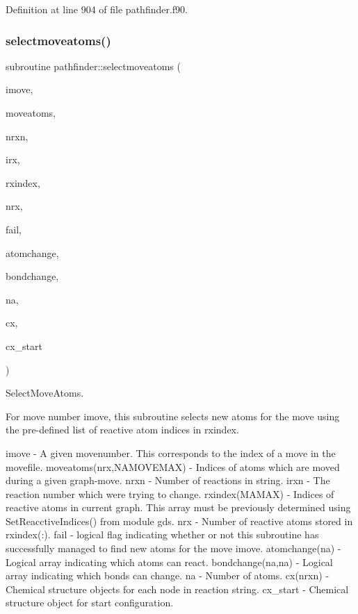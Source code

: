 Definition at line 904 of file pathfinder.\+f90.

\mbox{\label{namespacepathfinder_ad3176a0a22cdd34dd1b20fb26be06d66}} 
\subsubsection{\texorpdfstring{selectmoveatoms()}{selectmoveatoms()}}
{\footnotesize\ttfamily subroutine pathfinder\+::selectmoveatoms (\begin{DoxyParamCaption}\item[{integer}]{imove,  }\item[{integer, dimension(nrxn,namovemax)}]{moveatoms,  }\item[{integer}]{nrxn,  }\item[{integer}]{irx,  }\item[{integer, dimension(namax)}]{rxindex,  }\item[{integer}]{nrx,  }\item[{logical}]{fail,  }\item[{logical, dimension(na)}]{atomchange,  }\item[{logical, dimension(na,na)}]{bondchange,  }\item[{integer}]{na,  }\item[{type(\mbox{\hyperlink{structchemstr_1_1cxs}{cxs}}), dimension(nrxn)}]{cx,  }\item[{type(\mbox{\hyperlink{structchemstr_1_1cxs}{cxs}})}]{cx\+\_\+start }\end{DoxyParamCaption})}



Select\+Move\+Atoms. 

For move number imove, this subroutine selects new atoms for the move using the pre-\/defined list of reactive atom indices in rxindex.

imove -\/ A given movenumber. This corresponds to the index of a move in the movefile. moveatoms(nrx,\+N\+A\+M\+O\+V\+E\+M\+A\+X) -\/ Indices of atoms which are moved during a given graph-\/move. nrxn -\/ Number of reactions in string. irxn -\/ The reaction number which we\textquotesingle{}re trying to change. rxindex(\+M\+A\+M\+A\+X) -\/ Indices of reactive atoms in current graph. This array must be previously determined using Set\+Reacctive\+Indices() from module gds. nrx -\/ Number of reactive atoms stored in rxindex(\+:). fail -\/ logical flag indicating whether or not this subroutine has successfully managed to find new atoms for the move imove. atomchange(na) -\/ Logical array indicating which atoms can react. bondchange(na,na) -\/ Logical array indicating which bonds can change. na -\/ Number of atoms. cx(nrxn) -\/ Chemical structure objects for each node in reaction string. cx\+\_\+start -\/ Chemical structure object for start configuration. 

